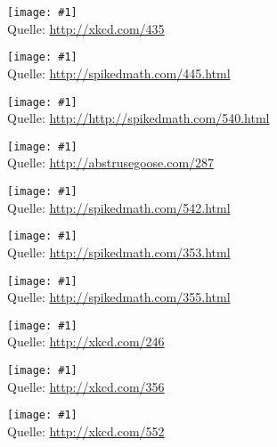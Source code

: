 \documentclass[a4paper,ngerman,landscape]{scrartcl}
\newcommand{\comic}[3]{\begin{center}
  \texttt{[image: \#1]} \\[2em]

  Quelle: \url{#2}
\end{center}\newpage}
\begin{document}
\comic{purity.png}{http://xkcd.com/435}{0.8}
\comic{three-logicians.png}{http://spikedmath.com/445.html}{1.4}
\comic{540-adventures-of-martin.png}{http://http://spikedmath.com/540.html}{1.4}
\comic{this_is_what_my_room_looks_like_when_i_draw}{http://abstrusegoose.com/287}{0.4}
\comic{542-science-vs-math}{http://spikedmath.com/542.html}{1.4}
\comic{353-fortune-teller-1}{http://spikedmath.com/353.html}{1.4}
\comic{355-fortune-teller-3}{http://spikedmath.com/355.html}{1.4}
\comic{labyrinth_puzzle}{http://xkcd.com/246}{2.7}
\comic{nerd_sniping}{http://xkcd.com/356}{0.8}
\comic{correlation}{http://xkcd.com/552}{1.6}
\end{document}
